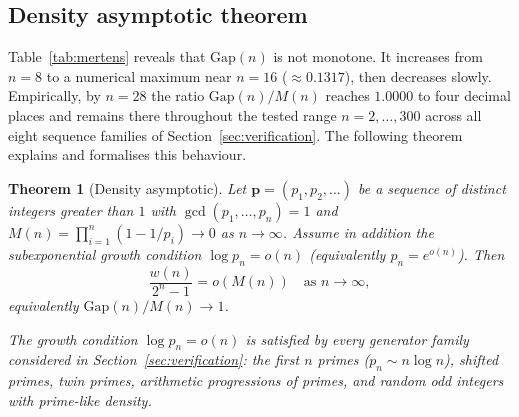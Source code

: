 \documentclass[11pt,a4paper]{amsart}
\theoremstyle{plain}
\newtheorem{theorem}{Theorem}[section]
\theoremstyle{definition}
\theoremstyle{remark}
\begin{document}
\subsection{Density asymptotic theorem}
\label{sec:density-theorem}

Table~\ref{tab:mertens} reveals that $\mathrm{Gap}(n)$ is not monotone.
It increases from $n=8$ to a numerical maximum near $n=16$
($\approx 0.1317$), then decreases slowly. Empirically, by $n=28$ the
ratio $\mathrm{Gap}(n)/M(n)$ reaches $1.0000$ to four decimal places
and remains there throughout the tested range $n=2,\ldots,300$ across
all eight sequence families of Section~\ref{sec:verification}. The
following theorem explains and formalises this behaviour.

\begin{theorem}[Density asymptotic]
\label{thm:density}
Let $\mathbf{p} = (p_1, p_2, \ldots)$ be a sequence of distinct integers
greater than $1$ with $\gcd(p_1,\ldots,p_n)=1$ and
$M(n) = \prod_{i=1}^n (1-1/p_i) \to 0$ as $n \to \infty$. Assume in
addition the subexponential growth condition $\log p_n = o(n)$
(equivalently $p_n = e^{o(n)}$). Then
\[
  \frac{w(n)}{2^n - 1} = o(M(n)) \quad \text{as } n \to \infty,
\]
equivalently $\mathrm{Gap}(n)/M(n) \to 1$.

The growth condition $\log p_n = o(n)$ is satisfied by every generator
family considered in Section~\ref{sec:verification}: the first $n$ primes
($p_n \sim n \log n$), shifted primes, twin primes, arithmetic progressions
of primes, and random odd integers with prime-like density.
\end{theorem}
\end{document}
